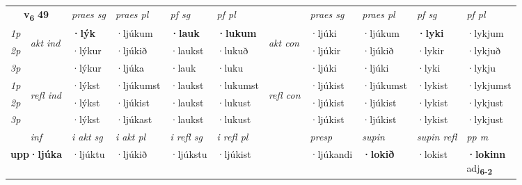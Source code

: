 \noindent
\begin{tabular}{lllllllllll} \toprule
\multicolumn{2}{c}{\textbf{v{\textsubscript{6}}} \Large{\textbf{49}}}  &  \textit{praes sg}  & \textit{praes pl}  &\textit{ pf sg} & \textit{pf pl} &  &  \textit{praes sg}  & \textit{praes pl}  & \textit{pf sg} & \textit{pf pl } \\*
	\cmidrule{3-6} \cmidrule{8-11}
 {\textit{1p}} & \multirow{3}{*}{\begin{turn}{90}\textit{akt ind}\end{turn}} & \textbf{·lýk} & ·ljúkum & \textbf{·lauk} & \textbf{·lukum} & \multirow{3}{*}{\begin{turn}{90}\textit{akt con}\end{turn}} &·ljúki & ·ljúkum & \textbf{·lyki} & ·lykjum\\*
 {\textit{2p}} &  &  ·lýkur  & ·ljúkið & ·laukst & ·lukuð & & ·ljúkir & ·ljúkið & ·lykir & ·lykjuð \\*
{\textit{3p}} &  & ·lýkur & ·ljúka & ·lauk & ·luku & & ·ljúki & ·ljúki& ·lyki & ·lykju \\*
\cmidrule{3-6} \cmidrule{8-11}
 {\textit{1p}} & \multirow{3}{*}{\begin{turn}{90}\textit{refl ind}\end{turn}}  & ·lýkst & ·ljúkumst & ·laukst & ·lukumst & \multirow{3}{*}{\begin{turn}{90}\textit{refl con}\end{turn}}  &·ljúkist & ·ljúkumst & ·lykist & ·lykjumst \\*
 {\textit{2p}} &  & ·lýkst & ·ljúkist & ·laukst & ·lukust & &·ljúkist & ·ljúkist & ·lykist & ·lykjust \\*
 {\textit{3p}}  & & ·lýkst & ·ljúkast & ·laukst & ·lukust & & ·ljúkist & ·ljúkist& ·lykist & ·lykjust \\*
\cmidrule{3-6} \cmidrule{8-11}

   \multicolumn{2}{c}{\textit{inf}}  & \textit{i akt sg} & \textit{i akt pl} & \textit{i refl sg} & \textit{i refl pl} && \textit{presp} & \textit{supin} & \textit{supin refl} & \textit{pp m} \\*
  \multicolumn{2}{c}{\textbf{upp\allowbreak ·ljúka}} & ·ljúktu  & ·ljúkið & ·ljúkstu & ·ljúkist && ·ljúkandi &  \textbf{·lokið} & ·lokist & \specialcell{\textbf{·lokinn} \\ adj\textbf{\textsubscript{6-2}}} \\*
\end{tabular}

